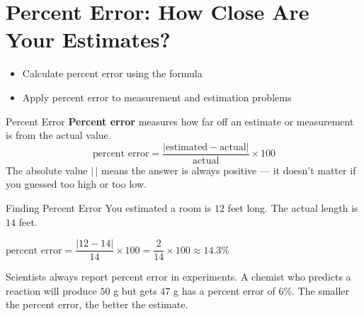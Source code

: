 \section{Percent Error: How Close Are Your Estimates?}

\begin{learningGoals}
\begin{itemize}
    \item Calculate percent error using the formula
    \item Apply percent error to measurement and estimation problems
\end{itemize}
\end{learningGoals}

\begin{conceptBox}{Percent Error}
\textbf{Percent error} measures how far off an estimate or measurement is from the actual value.
$$\text{percent error} = \frac{|\text{estimated} - \text{actual}|}{\text{actual}} \times 100$$
The absolute value $|\,|$ means the answer is always positive --- it doesn't matter if you guessed too high or too low.
\end{conceptBox}

\begin{workedExample}{Finding Percent Error}
You estimated a room is $12$ feet long. The actual length is $14$ feet.

$\text{percent error} = \dfrac{|12 - 14|}{14} \times 100 = \dfrac{2}{14} \times 100 \approx 14.3\%$
\end{workedExample}

\begin{realWorld}
Scientists always report percent error in experiments. A chemist who predicts a reaction will produce $50$ g but gets $47$ g has a percent error of $6\%$. The smaller the percent error, the better the estimate.
\end{realWorld}

